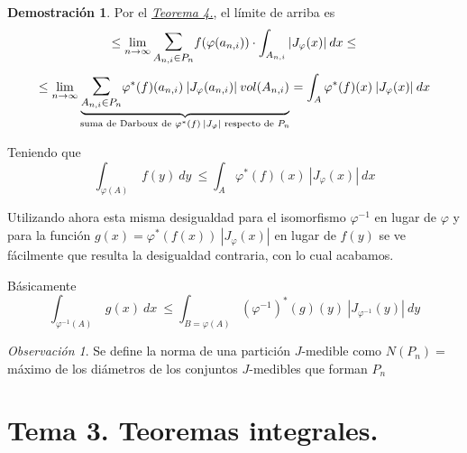 \documentclass[12pt,twoside]{report}
\theoremstyle{azul}
\theoremstyle{azul2}
\theoremstyle{plain}
\theoremstyle{definition}
\newtheorem*{dem}{Demostración}
\theoremstyle{remark}
\newtheorem*{obs}{Observación}
\begin{document}
\begin{dem}
Por el \hyperref[teo4]{\textit{Teorema 4.}}, el límite de arriba es
$$\leq \lim_{n \to \infty} \mathlarger{\mathlarger{\sum}}_{A_{n,i} \in P_n} f(\varphi(a_{n,i})) \cdot \int_{A_{n,i}} |J_{\varphi}(x)| \: dx \leq$$
$$\leq \lim_{n \to \infty} \underbrace{\mathlarger{\mathlarger{\sum}}_{A_{n,i} \in P_n} \varphi^* (f)(a_{n,i}) \: |J_{\varphi}(a_{n,i})| \: vol(A_{n,i}) }_{\text{suma de Darboux de }\varphi^* (f) \: |J_{\varphi}| \text{ respecto de }P_n}=\int_A \varphi^*(f)(x) \: |J_{\varphi}(x)| \: dx$$

Teniendo que 
$$\int_{\varphi(A)} \: f(y) \: dy  \: \leq \int_A \varphi^*(f)(x) \: |J_{\varphi}(x)| \: dx$$

Utilizando ahora esta misma desigualdad para el isomorfismo $\varphi^{-1}$ en lugar de $\varphi$ y para la función $g(x)= \varphi^* (f(x)) \: |J_{\varphi}(x)|$ en lugar de $f(y)$ se ve fácilmente que resulta la desigualdad contraria, con lo cual acabamos. 

Básicamente
$$\int_{\varphi^{-1}(A)} \: g(x) \: dx  \: \leq \int_{B=\varphi(A)} (\varphi^{-1})^*(g)(y) \: |J_{\varphi^{-1}}(y)| \: dy$$
\end{dem}
\begin{obs}
Se define la norma de una partición $J$-medible como $N(P_n)=$máximo de los diámetros de los conjuntos $J$-medibles que forman $P_n$
\end{obs}
\chapter{Tema 3. Teoremas integrales.}
\end{document}
